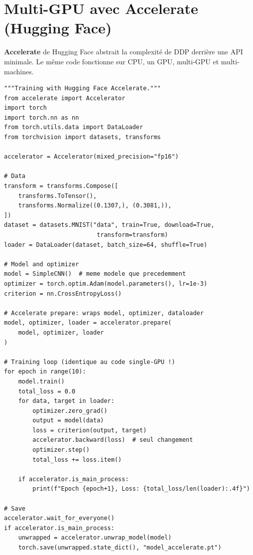 \section{Multi-GPU avec Accelerate (Hugging Face)}
\label{sec:accelerate}

\textbf{Accelerate} de Hugging Face abstrait la
complexit\'e de DDP derri\`ere une API minimale. Le m\^eme code fonctionne
sur CPU, un GPU, multi-GPU et multi-machines.

\begin{codeblock}[title=\textbf{Entra\^inement avec Accelerate}]
\begin{verbatim}
"""Training with Hugging Face Accelerate."""
from accelerate import Accelerator
import torch
import torch.nn as nn
from torch.utils.data import DataLoader
from torchvision import datasets, transforms

accelerator = Accelerator(mixed_precision="fp16")

# Data
transform = transforms.Compose([
    transforms.ToTensor(),
    transforms.Normalize((0.1307,), (0.3081,)),
])
dataset = datasets.MNIST("data", train=True, download=True,
                          transform=transform)
loader = DataLoader(dataset, batch_size=64, shuffle=True)

# Model and optimizer
model = SimpleCNN()  # meme modele que precedemment
optimizer = torch.optim.Adam(model.parameters(), lr=1e-3)
criterion = nn.CrossEntropyLoss()

# Accelerate prepare: wraps model, optimizer, dataloader
model, optimizer, loader = accelerator.prepare(
    model, optimizer, loader
)

# Training loop (identique au code single-GPU !)
for epoch in range(10):
    model.train()
    total_loss = 0.0
    for data, target in loader:
        optimizer.zero_grad()
        output = model(data)
        loss = criterion(output, target)
        accelerator.backward(loss)  # seul changement
        optimizer.step()
        total_loss += loss.item()

    if accelerator.is_main_process:
        print(f"Epoch {epoch+1}, Loss: {total_loss/len(loader):.4f}")

# Save
accelerator.wait_for_everyone()
if accelerator.is_main_process:
    unwrapped = accelerator.unwrap_model(model)
    torch.save(unwrapped.state_dict(), "model_accelerate.pt")
\end{verbatim}
\end{codeblock}

